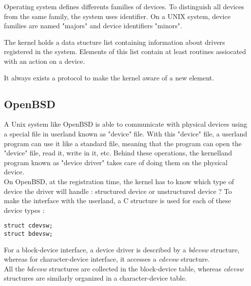 \documentclass[11pt]{report}
\begin{document}
Operating system defines differents families of devices. To distinguish all devices
from the same family, the system uses identifier. On a UNIX system, device families
are named "majors" and device identifiers "minors".

The kernel holds a data stucture list containing information about drivers
registered in the system. Elements of this list contain at least routines
assiocated with an action on a device.

It always exists a protocol to make the kernel aware of a new element.

\subsection{OpenBSD}

A Unix system like OpenBSD is able to communicate with physical devices
using a special file in userland known as "device" file.
With this "device" file, a userland program can use it like a standard
file, meaning that the program can open the "device" file, read it, write
in it, etc. Behind these operations, the kernelland program known as "device
driver" takes care of doing them on the physical device.\\

On OpenBSD, at the registration time, the kernel has to know which type of
device the driver will handle : structured device or unstructured device ?
To make the interface with the userland, a C structure is used for each of
these device types :
\begin{lstlisting}
struct cdevsw;
struct bdevsw;
\end{lstlisting}
For a block-device interface, a device driver is described by a {\it bdevsw} structure,
whereas for character-device interface, it accesses a {\it cdevsw} structure.\\
All the {\it bdevsw} structures are collected in the block-device table, whereas
{\it cdevsw} structures are similarly organized in a character-device table.\\
\end{document}
